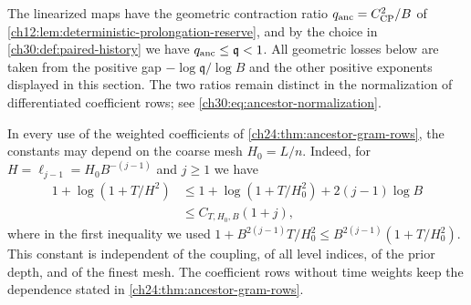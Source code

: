 The linearized maps have the geometric contraction ratio $q_{\mathrm{anc}}=C_{\mathrm{CP}}^2/B$ of \cref{ch12:lem:deterministic-prolongation-reserve}, and by the choice in \cref{ch30:def:paired-history} we have $q_{\mathrm{anc}}\le\mathfrak q<1$. All geometric losses below are taken from the positive gap $-\log\mathfrak q/\log B$ and the other positive exponents displayed in this section. The two ratios remain distinct in the normalization of differentiated coefficient rows; see \eqref{ch30:eq:ancestor-normalization}.

In every use of the weighted coefficients of \cref{ch24:thm:ancestor-gram-rows}, the constants may depend on the coarse mesh $H_0=L/n$. Indeed, for $H=\ell_{j-1}=H_0B^{-(j-1)}$ and $j\ge1$ we have
\begin{equation}\label{ch30:eq:retained-heat-log}
 \begin{split}
 1+\log(1+T/H^2)
 &\le1+\log(1+T/H_0^2)+2(j-1)\log B\\
 &\le C_{T,H_0,B}(1+j),
 \end{split}
\end{equation}
where in the first inequality we used $1+B^{2(j-1)}T/H_0^2\le B^{2(j-1)}(1+T/H_0^2)$. This constant is independent of the coupling, of all level indices, of the prior depth, and of the finest mesh. The coefficient rows without time weights keep the dependence stated in \cref{ch24:thm:ancestor-gram-rows}.

